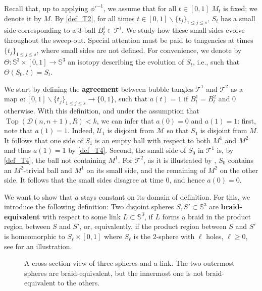 \documentclass{article}
\newcommand{\Sp}{\mathbb{S}}
\newcommand{\T}{\mathcal{T}}
\newcommand{\addcross}{\operatorname{Top}}
\begin{document}
Recall that, up to applying $\phi'^{-1}$, we assume that for all $t \in [0,1]$ $M_t$ is fixed; we denote it by $M$. By \ref{def_T2}, for all times $t \in [0,1] \smallsetminus \{t_j\}_{1 \leq j \leq s}$, $S_t$ has a small side corresponding to a $3$-ball $B_t^i \in \T^i$. We study how these small sides evolve throughout the sweep-out. Special attention must be paid to tangencies at times $\{t_j\}_{1 \leq j \leq s}$, where small sides are not defined. For convenience, we denote by $\Theta: \Sp^3 \times [0,1] \to \Sp^3$ an isotopy describing the evolution of $S_t$, i.e., such that $\Theta(S_0,t)=S_t$. 

 
\medskip

We start by defining the \textbf{agreement} between bubble tangles $\T^1$ and $\T^2$ as a map $a : [0,1] \smallsetminus \{t_j\}_{1 \leq j \leq s} \rightarrow \{0,1\}$, such that $a(t) = 1$ if $B_t^1 = B_t^2$ and $0$ otherwise. With this definition, and under the assumption that $\addcross(\mathcal{D}(n,n+1), R)< k$, we can infer that $a(0) = 0$ and $a(1) =1$: first, note that $a(1)=1$. Indeed, $\mathcal{U}_1$ is disjoint from $\mathcal{M}$ so that $S_1$ is disjoint from $M$. It follows that one side of $S_1$ is an empty ball with respect to both $M^1$ and $M^2$ and thus $a(1)=1$ by \ref{def_T4}. Second, the small side of $S_0$ in $\T^1$ is, by \ref{def_T4}, the ball not containing $M^1$. For $\T^2$, as it is illustrated by , $S_0$ contains an $M^2$-trivial ball and $M^1$ on its small side, and the remaining of $M^2$ on the other side. It follows that the small sides disagree at time $0$, and hence $a(0)=0$.

We want to show that $a$ stays constant on its domain of definition. For this, we introduce the following definition: Two disjoint spheres $S, S' \subset \Sp^3$ are \textbf{braid-equivalent} with respect to some link $L \subset \Sp^3$, if $L$ forms a braid in the product region between $S$ and $S'$, or, equivalently, if the product region between $S$ and $S'$ is homeomorphic to $S_\ell \times [0,1]$ where $S_\ell$ is the $2$-sphere with $\ell$ holes, $\ell \geq 0$, see  for an illustration.
 
\begin{figure}[ht]
\begin{center}
\caption{A cross-section view of three spheres and a link. The two outermost spheres are braid-equivalent, but the innermost one is not braid-equivalent to the others.}
\label{pic_braid_equi}
\end{center}
\end{figure}
\end{document}
